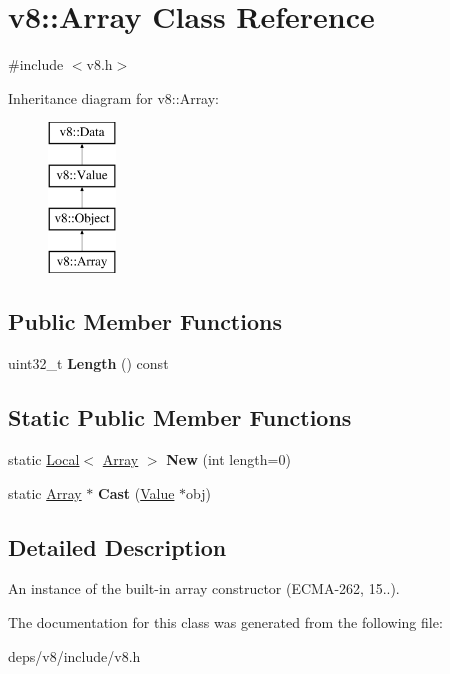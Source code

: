 \hypertarget{classv8_1_1_array}{}\section{v8\+:\+:Array Class Reference}
\label{classv8_1_1_array}


{\ttfamily \#include $<$v8.\+h$>$}

Inheritance diagram for v8\+:\+:Array\+:\begin{figure}[H]
\begin{center}
\leavevmode
\includegraphics[height=4.000000cm]{classv8_1_1_array}
\end{center}
\end{figure}
\subsection*{Public Member Functions}
\begin{DoxyCompactItemize}
\item 
\hypertarget{classv8_1_1_array_a3c47dfd8d26e60ed4fcdc683034d6d9c}{}uint32\+\_\+t {\bfseries Length} () const \label{classv8_1_1_array_a3c47dfd8d26e60ed4fcdc683034d6d9c}

\end{DoxyCompactItemize}
\subsection*{Static Public Member Functions}
\begin{DoxyCompactItemize}
\item 
\hypertarget{classv8_1_1_array_ac3b086f18d6fd7e41cf28fe90018e877}{}static \hyperlink{classv8_1_1_local}{Local}$<$ \hyperlink{classv8_1_1_array}{Array} $>$ {\bfseries New} (int length=0)\label{classv8_1_1_array_ac3b086f18d6fd7e41cf28fe90018e877}

\item 
\hypertarget{classv8_1_1_array_ac6187429ad14b1e8e6db20d991ac5cb5}{}static \hyperlink{classv8_1_1_array}{Array} $\ast$ {\bfseries Cast} (\hyperlink{classv8_1_1_value}{Value} $\ast$obj)\label{classv8_1_1_array_ac6187429ad14b1e8e6db20d991ac5cb5}

\end{DoxyCompactItemize}


\subsection{Detailed Description}
An instance of the built-\/in array constructor (E\+C\+M\+A-\/262, 15..). 

The documentation for this class was generated from the following file\+:\begin{DoxyCompactItemize}
\item 
deps/v8/include/v8.\+h\end{DoxyCompactItemize}
